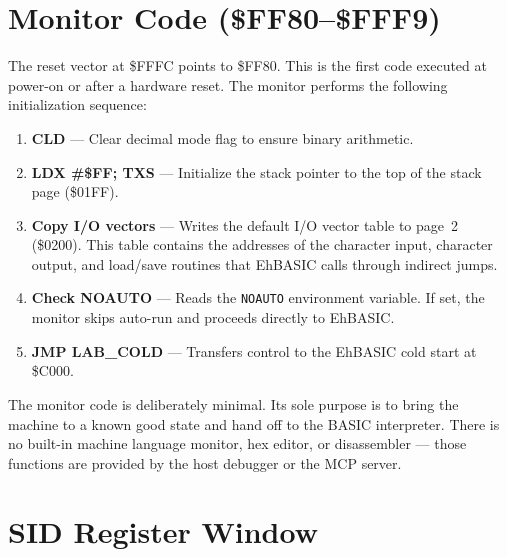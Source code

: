 \section{Monitor Code (\$FF80--\$FFF9)}
\label{sec:monitor}


The reset vector at \$FFFC points to \$FF80.  This is the first code
executed at power-on or after a hardware reset.  The monitor performs the
following initialization sequence:

\begin{enumerate}
  \item \textbf{CLD} --- Clear decimal mode flag to ensure binary arithmetic.
  \item \textbf{LDX \#\$FF; TXS} --- Initialize the stack pointer to the
        top of the stack page (\$01FF).
  \item \textbf{Copy I/O vectors} --- Writes the default I/O vector table
        to page~2 (\$0200).  This table contains the addresses of the
        character input, character output, and load/save routines that
        EhBASIC calls through indirect jumps.
  \item \textbf{Check NOAUTO} --- Reads the \texttt{NOAUTO} environment
        variable.  If set, the monitor skips auto-run and proceeds
        directly to EhBASIC.
  \item \textbf{JMP LAB\_COLD} --- Transfers control to the EhBASIC cold
        start at \$C000.
\end{enumerate}

\begin{notebox}
The monitor code is deliberately minimal.  Its sole purpose is to bring
the machine to a known good state and hand off to the BASIC interpreter.
There is no built-in machine language monitor, hex editor, or disassembler
--- those functions are provided by the host debugger or the MCP server.
\end{notebox}


\section{SID Register Window}
\label{sec:rom-sid}

